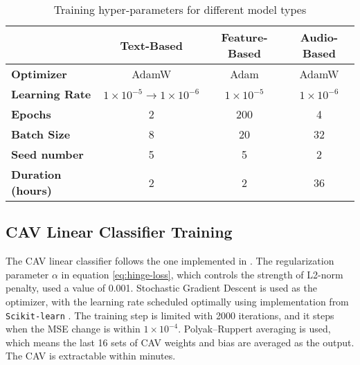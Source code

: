 \begin{table}[H]
    \centering
    \begin{tabular}{|l|c|c|c|}
        \hline
                                  & \textbf{Text-Based}                             & \textbf{Feature-Based} & \textbf{Audio-Based} \\
        \hline
        \textbf{Optimizer}        & AdamW                                           & Adam                   & AdamW                \\ \hline
        \textbf{Learning Rate}    & $1 \times 10^{-5} \rightarrow 1 \times 10^{-6}$ & $1 \times 10^{-5}$     & $1 \times 10^{-6}$   \\ \hline
        \textbf{Epochs}           & 2                                               & 200                    & 4                    \\ \hline
        \textbf{Batch Size}       & 8                                               & 20                     & 32                   \\ \hline
        \textbf{Seed number}      & 5                                               & 5                      & 2                    \\ \hline
        \textbf{Duration (hours)} & 2                                               & 2                      & 36                   \\ \hline
    \end{tabular}
    \caption{Training hyper-parameters for different model types}
    \label{tab:training_hyper_param}
\end{table}

\subsection{CAV Linear Classifier Training}
The CAV linear classifier follows the one implemented in \cite{feature_bias}. The regularization parameter $\alpha$ in equation \ref{eq:hinge-loss}, which controls the strength of L2-norm penalty, used a value of 0.001. Stochastic Gradient Descent is used as the optimizer, with the learning rate scheduled optimally using implementation from \verb|Scikit-learn| \cite{scikit-learn}. The training step is limited with 2000 iterations, and it steps when the MSE change is within $1 \times 10^{-4}$. Polyak–Ruppert averaging is used, which means the last 16 sets of CAV weights and bias are averaged as the output. The CAV is extractable within minutes.

